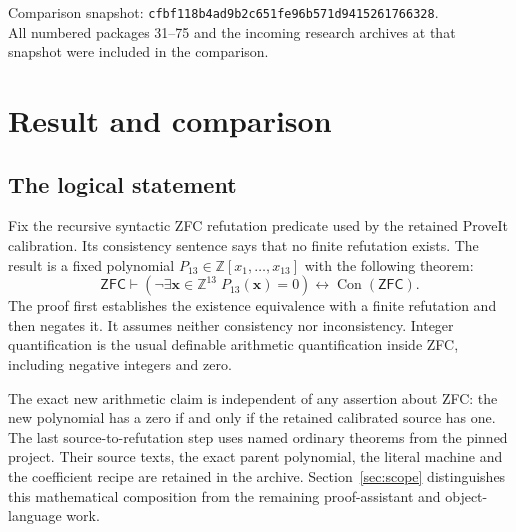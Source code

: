 \documentclass[11pt]{article}
\theoremstyle{remark}\newtheorem{remark}[theorem]{Remark}
\newcommand{\Z}{\mathbb Z}\newcommand{\Q}{\mathbb Q}\newcommand{\N}{\mathbb N}
\newcommand{\ZFC}{\mathsf{ZFC}}\newcommand{\Con}{\operatorname{Con}}
\newcommand{\pin}{\texttt{cfbf118b4ad9b2c651fe96b571d9415261766328}}
\begin{document}
\vfill
\small Comparison snapshot: \pin.\\
All numbered packages 31--75 and the incoming research archives at that
snapshot were included in the comparison.
\newpage
\begingroup\small\setlength{\parskip}{0pt}\tableofcontents\endgroup
\newpage

\section{Result and comparison}

\subsection{The logical statement}
Fix the recursive syntactic ZFC refutation predicate used by the retained
ProveIt calibration. Its consistency sentence says that no finite refutation
exists. The result is a fixed polynomial $P_{13}\in\Z[x_1,\ldots,x_{13}]$
with the following theorem:
\begin{equation}\label{eq:target}
 \ZFC\vdash
 \left(\neg\exists\mathbf x\in\Z^{13}\;P_{13}(\mathbf x)=0\right)
 \longleftrightarrow\Con(\ZFC).
\end{equation}
The proof first establishes the existence equivalence with a finite
refutation and then negates it. It assumes neither consistency nor
inconsistency. Integer quantification is the usual definable arithmetic
quantification inside ZFC, including negative integers and zero.

The exact new arithmetic claim is independent of any assertion about ZFC:
the new polynomial has a zero if and only if the retained calibrated source
has one. The last source-to-refutation step uses named ordinary theorems
from the pinned project. Their source texts, the exact parent polynomial,
the literal machine and the coefficient recipe are retained in the archive.
Section~\ref{sec:scope} distinguishes this mathematical composition from the
remaining proof-assistant and object-language work.
\end{document}
